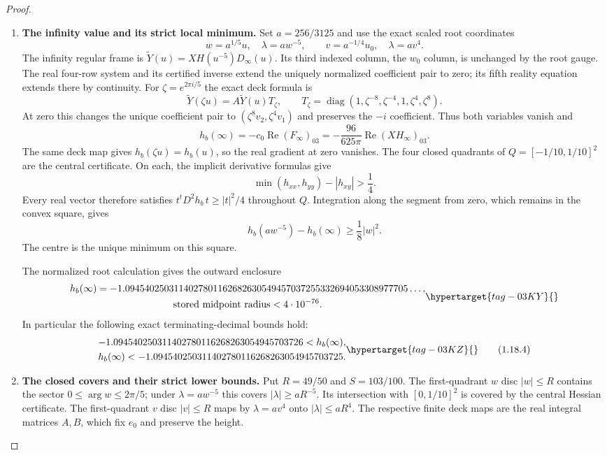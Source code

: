 \begin{proof}
\begin{enumerate}[label={$\langle1\rangle$\arabic*.}]
\item \textbf{The infinity value and its strict local minimum.}
Set $a=256/3125$ and use the exact scaled root coordinates
\[
 w=a^{1/5}u,\quad\lambda=aw^{-5},\qquad
 v=a^{-1/4}u_0,\quad\lambda=av^4.
\]
The infinity regular frame is
$\widetilde Y(u)=XH(u^{-5})D_\infty(u)$.
Its third indexed column, the $w_0$ column, is unchanged by the
root gauge.  The real four-row system and its certified inverse
extend the uniquely normalized coefficient pair to zero; its
fifth reality equation extends there by continuity.
For $\zeta=e^{2\pi i/5}$ the exact deck formula is
\[
 \widetilde Y(\zeta u)=A\widetilde Y(u)T_\zeta,
 \qquad T_\zeta=\operatorname{diag}(1,\zeta^{-8},\zeta^{-4},1,
                                     \zeta^4,\zeta^8).
\]
At zero this changes the unique coefficient pair to
$(\zeta^8v_2,\zeta^4v_1)$ and preserves the $-i$ coefficient.
Thus both variables vanish and
\[
 h_b(\infty)=-c_0\operatorname{Re}(F_\infty)_{03}
 =-\frac{96}{625\pi}\operatorname{Re}(XH_\infty)_{03}.
\]
The same deck map gives $h_b(\zeta u)=h_b(u)$, so the real
gradient at zero vanishes.  The four closed quadrants of
$Q=[-1/10,1/10]^2$ are the central certificate.  On each, the
implicit derivative formulas give
\[
 \min(h_{xx},h_{yy})-|h_{xy}|>\frac14.
\]
Every real vector therefore satisfies
$t^tD^2h_b\,t\ge|t|^2/4$ throughout $Q$.  Integration along
the segment from zero, which remains in the convex square, gives
\[
 h_b(aw^{-5})-h_b(\infty)\ge\frac18|w|^2.
 \tag{1.18.5}
\]
The centre is the unique minimum on this square.

The normalized root calculation gives the outward enclosure
\[
 \begin{gathered}
 h_b(\infty)=
 -1.0945402503114027801162682630549457037255332694053308977705\ldots,\\
 \text{stored midpoint radius}<4\cdot10^{-76}.
 \end{gathered}\hypertarget{tag-03KY}{}\label{layout:V:fresh-minimum}
\]
In particular the following exact terminating-decimal bounds hold:
\[
 \begin{gathered}
 -1.094540250311402780116268263054945703726<h_b(\infty),\\
 h_b(\infty)<-1.094540250311402780116268263054945703725.
 \end{gathered}\hypertarget{tag-03KZ}{}\label{layout:V:fresh-bounds}
 \tag{1.18.4}
\]
\item \textbf{The closed covers and their strict lower bounds.}
Put $R=49/50$ and $S=103/100$.  The first-quadrant $w$ disc
$|w|\le R$ contains the sector $0\le\arg w\le2\pi/5$;
under $\lambda=aw^{-5}$ this covers $|\lambda|\ge aR^{-5}$.
Its intersection with $[0,1/10]^2$ is covered by the central
Hessian certificate.  The first-quadrant $v$ disc $|v|\le R$
maps by $\lambda=av^4$ onto $|\lambda|\le aR^4$.
The respective finite deck maps are the real integral matrices
$A,B$, which fix $e_0$ and preserve the height.


\end{enumerate}
\end{proof}
